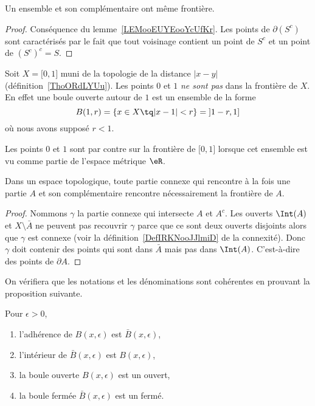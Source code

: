 \begin{corollary}
    Un ensemble et son complémentaire ont même frontière.
\end{corollary}

\begin{proof}
    Conséquence du lemme~\ref{LEMooEUYEooYcUfKr}. Les points de \( \partial(S^c)\) sont caractérisés par le fait que tout voisinage contient un point de \( S^c\) et un point de \( (S^c)^c=S\).
\end{proof}

\begin{example}
    Soit \( X=\mathopen[ 0 , 1 \mathclose]\) muni de la topologie de la distance \( | x-y |\) (définition~\ref{ThoORdLYUu}). Les points \( 0\) et \( 1\) \emph{ne sont pas} dans la frontière de $X$. En effet une boule ouverte autour de \( 1\) est un ensemble de la forme
    \begin{equation}
        B(1,r)=\{ x\in X\tq | x-1 |<r \}=\mathopen] 1-r , 1 \mathclose]
    \end{equation}
    où nous avons supposé \( r<1\).

    Les points \( 0\) et \( 1\) sont par contre sur la frontière de \( \mathopen[ 0 , 1 \mathclose]\) lorsque cet ensemble est vu comme partie de l'espace métrique \( \eR\).
\end{example}

\begin{lemma}        \label{LEMooLKWEooItGnkP}
    Dans un espace topologique, toute partie connexe qui rencontre à la fois une partie \( A\) et son complémentaire rencontre nécessairement la frontière de \( A\).
\end{lemma}

\begin{proof}
    Nommons \( \gamma\) la partie connexe qui intersecte \( A\) et \( A^c\). Les ouverts \( \Int(A)\) et \( X\setminus \bar A\) ne peuvent pas recouvrir \( \gamma\) parce que ce sont deux ouverts disjoints alors que \( \gamma\) est connexe (voir la définition~\ref{DefIRKNooJJlmiD} de la connexité). Donc \( \gamma\) doit contenir des points qui sont dans \( \bar A\) mais pas dans \( \Int(A)\). C'est-à-dire des points de \( \partial A\).
\end{proof}

On vérifiera que les notations et les dénominations sont cohérentes en prouvant la proposition suivante.
\begin{proposition}Pour $\epsilon > 0$,
  \begin{enumerate}
  \item l'adhérence de $B(x,\epsilon)$ est $\bar B(x,\epsilon)$,
  \item l'intérieur de $\bar B(x,\epsilon)$ est $B(x,\epsilon)$,
  \item la boule ouverte $B(x,\epsilon)$ est un ouvert,
  \item la boule fermée $\bar B(x,\epsilon)$ est un fermé.
  \end{enumerate}
\end{proposition}

